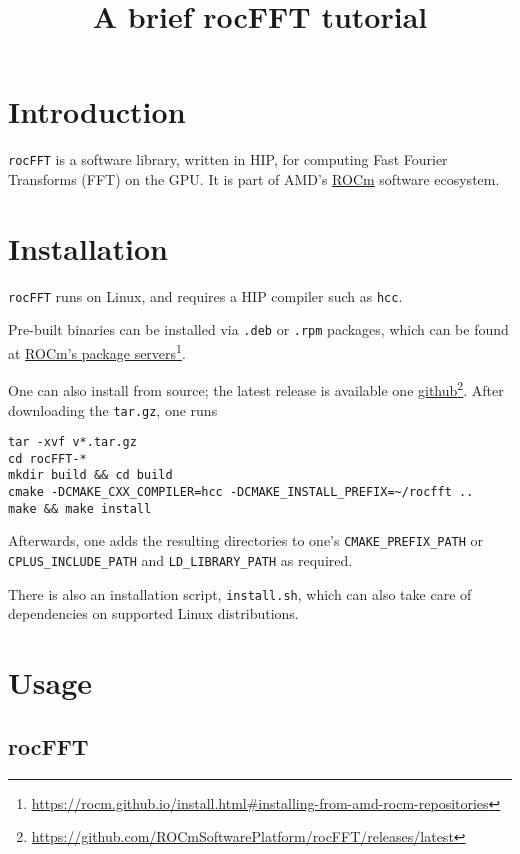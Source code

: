 \documentclass[10pt]{article}
\title{A brief rocFFT tutorial}
\date{}
\renewcommand{\(}{\left(}
\renewcommand{\)}{\right)}
\begin{document}
\maketitle

\section{Introduction}

\texttt{rocFFT} is a software library, written in HIP, for computing
Fast Fourier Transforms (FFT) on the GPU. It is part of AMD's
\href{https://github.com/RadeonOpenCompute}{ROCm} software ecosystem.

\section{Installation}

\texttt{rocFFT} runs on Linux, and requires a HIP compiler such as
\texttt{hcc}.

Pre-built binaries can be installed via \texttt{.deb} or \texttt{.rpm}
packages, which can be found at
\href{https://rocm.github.io/install.html#installing-from-amd-rocm-repositories}{ROCm's
  package servers}\footnote{\url{https://rocm.github.io/install.html\#installing-from-amd-rocm-repositories}}.

One can also install from source; the latest release is available one
\href{https://github.com/ROCmSoftwarePlatform/rocFFT/releases/latest}{github}\footnote{\url{https://github.com/ROCmSoftwarePlatform/rocFFT/releases/latest}}.
After downloading the \texttt{tar.gz}, one runs
\begin{verbatim}
tar -xvf v*.tar.gz
cd rocFFT-*
mkdir build && cd build
cmake -DCMAKE_CXX_COMPILER=hcc -DCMAKE_INSTALL_PREFIX=~/rocfft ..
make && make install
\end{verbatim}
Afterwards, one adds the resulting directories to one's
\texttt{CMAKE_PREFIX_PATH} or \texttt{CPLUS_INCLUDE_PATH} and
\texttt{LD_LIBRARY_PATH} as required.

There is also an installation script, \texttt{install.sh}, which can
also take care of dependencies on supported Linux distributions.

\section{Usage}

\subsection{rocFFT}
\end{document}
